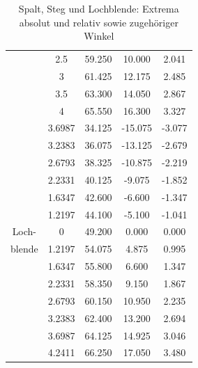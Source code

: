 \documentclass[12pt,a4paper,titlepage,headinclude,bibtotoc]{scrartcl}
\begin{document}
\begin{table}[!htb]
\begin{tabular}{|c||c|c|c|c|}
		&	2.5	&	59.250	&	10.000	&	2.041	\\
		&	3	&	61.425	&	12.175	&	2.485	\\
		&	3.5	&	63.300	&	14.050	&	2.867	\\
		&	4	&	65.550	&	16.300	&	3.327	\\
		\hline
		&	3.6987	&	34.125	&	-15.075	&	-3.077	\\
		&	3.2383	&	36.075	&	-13.125	&	-2.679	\\
		&	2.6793	&	38.325	&	-10.875	&	-2.219	\\
		&	2.2331	&	40.125	&	-9.075	&	-1.852	\\
		&	1.6347	&	42.600	&	-6.600	&	-1.347	\\
		&	1.2197	&	44.100	&	-5.100	&	-1.041	\\
		Loch- &	0	&	49.200	&	0.000	&	0.000	\\
		blende &	1.2197	&	54.075	&	4.875	&	0.995	\\
		&	1.6347	&	55.800	&	6.600	&	1.347	\\
		&	2.2331	&	58.350	&	9.150	&	1.867	\\
		&	2.6793	&	60.150	&	10.950	&	2.235	\\
		&	3.2383	&	62.400	&	13.200	&	2.694	\\
		&	3.6987	&	64.125	&	14.925	&	3.046	\\
		&	4.2411	&	66.250	&	17.050	&	3.480	\\
		\hline
	\end{tabular}
	\caption{Spalt, Steg und Lochblende: Extrema absolut und relativ sowie zugehöriger Winkel}
	\label{tab:extrema1}
\end{table}
\end{document}
